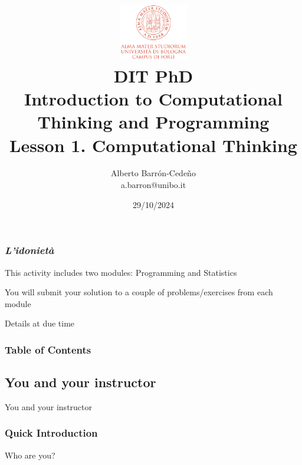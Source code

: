 \documentclass[xcolor=x11names,handout]{beamer}
\title[DIT, PhD]{\vspace{-2pt}\\
\href{http://www.dit.unibo.it}{\includegraphics[width=30mm]{img/UNIBO_logo.png}
} \\
\vspace{6mm} {DIT PhD\\ Introduction to Computational Thinking and Programming} 
\\
{\large Lesson 1. Computational Thinking}\vspace{-5mm}}
\author[A. Barr\'on-Cede\~no]{{Alberto Barr\'on-Cede\~no \\ a.barron@unibo.it
\vspace{-8mm}}
\institute[DIT-UniBO]{DIT-UniBO}}
\date[2024]{29/10/2024}
\begin{document}
{%
	\begin{frame}[plain]
		\titlepage
	\end{frame}
}

\begin{frame}
\frametitle{\textit{L'idonietà}}
 
This activity includes two modules: Programming and Statistics
\bigskip 

You will submit your solution to a couple of problems/exercises from each 
module
\bigskip

Details at due time
\end{frame}

\begin{frame}
\frametitle{Table of Contents}
\tableofcontents
\end{frame}


\begin{frame}
\section{You and your instructor}
\centering
\alert{You and your instructor}
\end{frame}

\begin{frame}
\frametitle{Quick Introduction}

Who are you?
\end{frame}
\end{document}
